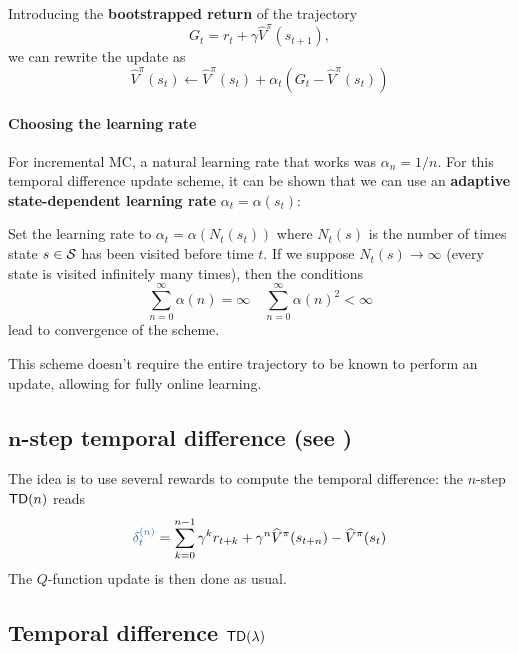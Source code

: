\documentclass[../course-notes.tex]{subfiles}
\begin{document}
\begin{remark}
	Introducing the \textbf{bootstrapped return} of the trajectory
	\[
		G_t = r_t + \gamma\widehat{V}^\pi(s_{t+1}),
	\]
	we can rewrite the update as
	\[
		\widehat{V}^\pi(s_t) \leftarrow \widehat{V}^\pi(s_t) + \alpha_t (G_t - \widehat{V}^\pi(s_t))
	\]
\end{remark}


\paragraph{Choosing the learning rate} For incremental MC, a natural learning rate that works was $\alpha_n = 1/n$. For this temporal difference update scheme, it can be shown that we can use an \textbf{adaptive state-dependent learning rate} $\alpha_t = \alpha(s_t)$:
\begin{prop}\label{prop:ValueTD0learningRate}
	Set the learning rate to $\alpha_t = \alpha(N_t(s_t))$ where $N_t(s)$ is the number of times state $s\in\mathcal{S}$ has been visited before time $t$. If we suppose $N_t(s) \to \infty$ (every state is visited infinitely many times), then the conditions
	\begin{equation}
	\sum_{n=0}^{\infty} \alpha(n) = \infty \quad
	\sum_{n=0}^{\infty} \alpha(n)^2 < \infty
	\end{equation}
	lead to convergence of the scheme.
\end{prop}

This scheme doesn't require the entire trajectory to be known to perform an update, allowing for fully online learning.


\subsection{$\boldsymbol{n}$-step temporal difference (see \cite[chap.~7]{Sutton1998})}

The idea is to use several rewards to compute the temporal difference: the $n$-step $\mathsf{TD}(n)$ reads
\begin{equation}
	{\bluefont \delta^{(n)}_t} =
	\sum_{k=0}^{n-1} \gamma^k r_{t+k}
	+ \gamma^n \widehat{V}^\pi(s_{t+n}) - \widehat{V}^\pi(s_t)
\end{equation}
The $Q$-function update is then done as usual.



\subsection{Temporal difference $\mathsf{TD}(\lambda)$}
\end{document}
